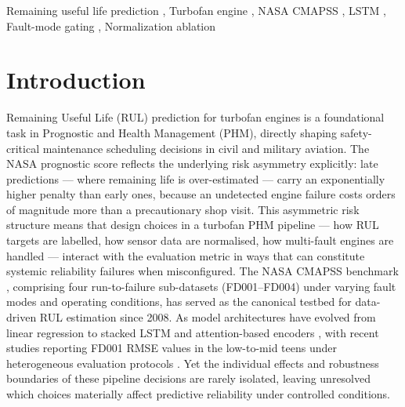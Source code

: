 \documentclass[preprint,10pt]{elsarticle}
\begin{document}
\begin{frontmatter}
\begin{abstract}
These results provide an actionable design priority ordering for industrial RUL pipelines: label engineering and fleet normalization exert the largest effects; hard fault-mode routing is a deployment risk to manage, not a performance lever; and loss customization provides no measurable benefit under the evaluated conditions.
\end{abstract}

\begin{keyword}
Remaining useful life prediction \sep
Turbofan engine \sep
NASA CMAPSS \sep
LSTM \sep
Fault-mode gating \sep
Normalization ablation
\end{keyword}

\end{frontmatter}

\linenumbers


\section{Introduction}

Remaining Useful Life (RUL) prediction for turbofan engines is a foundational task in Prognostic and Health Management (PHM), directly shaping safety-critical maintenance scheduling decisions in civil and military aviation. The NASA prognostic score reflects the underlying risk asymmetry explicitly: late predictions — where remaining life is over-estimated — carry an exponentially higher penalty than early ones, because an undetected engine failure costs orders of magnitude more than a precautionary shop visit. This asymmetric risk structure means that design choices in a turbofan PHM pipeline — how RUL targets are labelled, how sensor data are normalised, how multi-fault engines are handled — interact with the evaluation metric in ways that can constitute systemic reliability failures when misconfigured. The NASA CMAPSS benchmark \cite{ref01}, comprising four run-to-failure sub-datasets (FD001–FD004) under varying fault modes and operating conditions, has served as the canonical testbed for data-driven RUL estimation since 2008. As model architectures have evolved from linear regression \cite{ref02} to stacked LSTM \cite{ref05,ref06} and attention-based encoders \cite{ref13,ref14,ref45}, with recent studies reporting FD001 RMSE values in the low-to-mid teens under heterogeneous evaluation protocols \cite{ref13,ref15,ref29}. Yet the individual effects and robustness boundaries of these pipeline decisions are rarely isolated, leaving unresolved which choices materially affect predictive reliability under controlled conditions.
\end{document}
